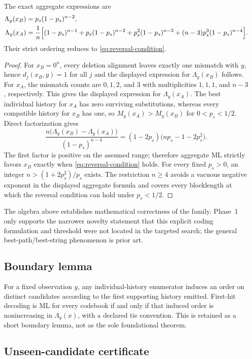 \documentclass[11pt]{article}
\theoremstyle{definition}
\theoremstyle{remark}
\begin{document}
The exact aggregate expressions are
\begin{align}
\Lambda_y(x_B)
&=p_s(1-p_s)^{n-2},\\
\Lambda_y(x_A)
&=\frac1n\Bigl[
(1-p_s)^{n-1}
+p_s(1-p_s)^{n-2}
+p_s^2(1-p_s)^{n-3}
+(n-3)p_s^3(1-p_s)^{n-4}
\Bigr].
\end{align}
Their strict ordering reduces to \cref{eq:reversal-condition}.

\begin{proof}
For $x_B=0^n$, every deletion alignment leaves exactly one mismatch with $y$, hence $d_j(x_B,y)=1$ for all $j$ and the displayed expression for $\Lambda_y(x_B)$ follows. For $x_A$, the mismatch counts are $0,1,2$, and $3$ with multiplicities $1,1,1$, and $n-3$, respectively. This gives the displayed expression for $\Lambda_y(x_A)$. The best individual history for $x_A$ has zero surviving substitutions, whereas every compatible history for $x_B$ has one, so $M_y(x_A)>M_y(x_B)$ for $0<p_s<1/2$. Direct factorization gives
\[
 \frac{n\bigl(\Lambda_y(x_B)-\Lambda_y(x_A)\bigr)}{(1-p_s)^{n-4}}
 =(1-2p_s)\bigl(np_s-1-2p_s^2\bigr).
\]
The first factor is positive on the assumed range; therefore aggregate ML strictly favors $x_B$ exactly when \cref{eq:reversal-condition} holds. For every fixed $p_s>0$, an integer $n>(1+2p_s^2)/p_s$ exists. The restriction $n\ge4$ avoids a vacuous negative exponent in the displayed aggregate formula and covers every blocklength at which the reversal condition can hold under $p_s<1/2$.
\end{proof}

The algebra above establishes mathematical correctness of the family. Phase~1 only supports the narrower novelty statement that this explicit coding formulation and threshold were not located in the targeted search; the general best-path/best-string phenomenon is prior art.

\subsection{Boundary lemma}
\label{sec:boundary}

For a fixed observation $y$, any individual-history enumerator induces an order on distinct candidates according to the first supporting history emitted. First-hit decoding is ML for every codebook if and only if that induced order is nonincreasing in $\Lambda_y(x)$, with a declared tie convention. This is retained as a short boundary lemma, not as the sole foundational theorem.

\subsection{Unseen-candidate certificate}
\end{document}
